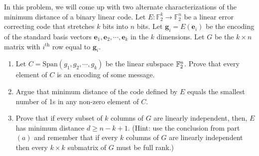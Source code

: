 In this problem, we will come up with two alternate characterizations of the minimum
distance of a binary linear code. Let $E:\mathbb F_{2}^{k}\to \mathbb F_{2}^{n}$ be a linear error correcting code that stretches $k$ bits into $n$ bits. Let $\pmb g_{i} = E(\pmb e_{i})$ be the encoding of the standard basis vectors $\pmb e_{1},\pmb e_{2},\cdots,\pmb e_{k}$ in the $k$ dimensions. Let $G$ be the $k\times n$ matrix with $i^{\text{th}}$ row equal to $\pmb g_{i}$.
\begin{enumerate}[leftmargin=*, label=(\alph*)]
\item Let $C= \text{Span}(g_{1},g_{2},\cdots,g_{k})$ be the linear subspace $\mathbb{F}_{2}^{n}$. Prove that every element of $C$ is an encoding of some message.
\item Argue that minimum distance of the code defined by $E$ equals the smallest number of 1s in any non-zero element of $C$.
\item Prove that if every subset of $k$ columns of $G$ are linearly independent,
then, $E$ has minimum distance $d \ge n-k+1$. (Hint: use the conclusion from
part $(a)$ and remember that if every $k$ columns of $G$ are linearly independent then every $k\times k$ submatrix of $G$ must be full rank.)
\end{enumerate}

